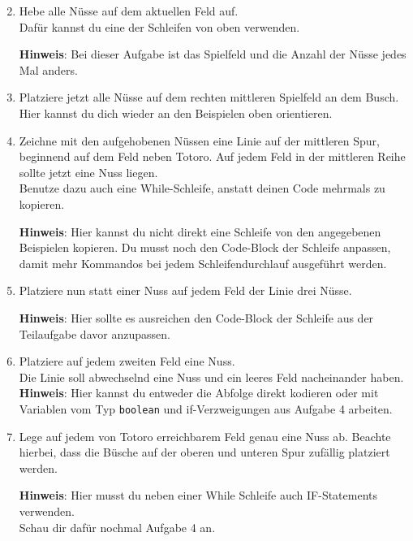 \begin{enumerate} \setcounter{enumi}{1}
    \item Hebe alle Nüsse auf dem aktuellen Feld auf.\\
    Dafür kannst du eine der Schleifen von oben verwenden.
    
    \textbf{Hinweis}: Bei dieser Aufgabe ist das Spielfeld und die Anzahl der Nüsse jedes Mal anders.
    \item Platziere jetzt alle Nüsse auf dem rechten mittleren Spielfeld an dem Busch.
    Hier kannst du dich wieder an den Beispielen oben orientieren.
    \item Zeichne mit den aufgehobenen Nüssen eine Linie auf der mittleren Spur, beginnend auf dem Feld neben Totoro.
    Auf jedem Feld in der mittleren Reihe sollte jetzt eine Nuss liegen.\\
    Benutze dazu auch eine While-Schleife, anstatt deinen Code mehrmals zu kopieren.
    
    \textbf{Hinweis}: Hier kannst du nicht direkt eine Schleife von den angegebenen Beispielen kopieren.
    Du musst noch den Code-Block der Schleife anpassen, damit mehr Kommandos bei jedem Schleifendurchlauf ausgeführt werden.
    \item Platziere nun statt einer Nuss auf jedem Feld der Linie drei Nüsse.
    
    \textbf{Hinweis}: Hier sollte es ausreichen den Code-Block der Schleife aus der Teilaufgabe davor anzupassen.
    \item Platziere auf jedem zweiten Feld eine Nuss.\\
    Die Linie soll abwechselnd eine Nuss und ein leeres Feld nacheinander haben.\\
    
    \textbf{Hinweis}: Hier kannst du entweder die Abfolge direkt kodieren oder mit Variablen vom Typ \lstinline{boolean} und if-Verzweigungen aus Aufgabe 4 arbeiten.
    \item \optional Lege auf jedem von Totoro  erreichbarem Feld genau eine Nuss ab.
    Beachte hierbei, dass die Büsche auf der oberen und unteren Spur zufällig platziert werden.
    
    \textbf{Hinweis}: Hier musst du neben einer While Schleife auch IF-Statements verwenden.\\
    Schau dir dafür nochmal Aufgabe 4 an.
\end{enumerate}
